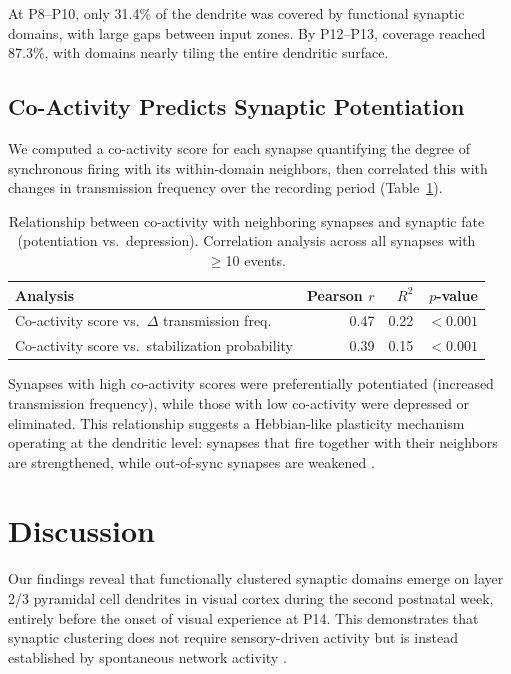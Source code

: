 \documentclass[11pt]{article}
\begin{document}
At P8--P10, only 31.4\% of the dendrite was covered by functional synaptic domains, with large gaps between input zones. By P12--P13, coverage reached 87.3\%, with domains nearly tiling the entire dendritic surface.

\subsection{Co-Activity Predicts Synaptic Potentiation}

We computed a co-activity score for each synapse quantifying the degree of synchronous firing with its within-domain neighbors, then correlated this with changes in transmission frequency over the recording period (Table~\ref{tab:coactivity}).

\begin{table}[H]
\centering
\caption{Relationship between co-activity with neighboring synapses and synaptic fate (potentiation vs.\ depression). Correlation analysis across all synapses with $\geq$10 events.}
\label{tab:coactivity}
\begin{tabular}{lrrr}
\toprule
\textbf{Analysis} & \textbf{Pearson $r$} & \textbf{$R^2$} & \textbf{$p$-value} \\
\midrule
Co-activity score vs.\ $\Delta$ transmission freq. & 0.47 & 0.22 & $<0.001$ \\
Co-activity score vs.\ stabilization probability & 0.39 & 0.15 & $<0.001$ \\
\bottomrule
\end{tabular}
\end{table}

Synapses with high co-activity scores were preferentially potentiated (increased transmission frequency), while those with low co-activity were depressed or eliminated. This relationship suggests a Hebbian-like plasticity mechanism operating at the dendritic level: synapses that fire together with their neighbors are strengthened, while out-of-sync synapses are weakened \citep{hebb1949organization, feldman2012spike}.

\section{Discussion}

Our findings reveal that functionally clustered synaptic domains emerge on layer 2/3 pyramidal cell dendrites in visual cortex during the second postnatal week, entirely before the onset of visual experience at P14. This demonstrates that synaptic clustering does not require sensory-driven activity but is instead established by spontaneous network activity \citep{blankenship2010mechanisms, ackman2012retinal}.
\end{document}
